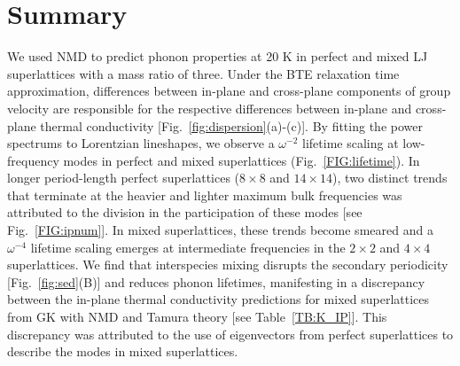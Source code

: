 \documentclass[aps,prb,preprint,preprintnumbers,amsmath,amssymb,floatfix,superscriptaddress]{revtex4}
\begin{document}


\section{Summary}

We used NMD to predict phonon properties at 20 K in perfect and mixed LJ superlattices with a mass ratio of three. Under the BTE relaxation time approximation, differences between in-plane and cross-plane components of group velocity are responsible for the respective differences between in-plane and cross-plane thermal conductivity [Fig.~\ref{fig:dispersion}(a)-(c)]. By fitting the power spectrums to Lorentzian lineshapes, we observe a $\omega^{-2}$ lifetime scaling at low-frequency modes in perfect and mixed superlattices (Fig.~\ref{FIG:lifetime}). In longer period-length perfect superlattices ($8 \times 8$ and $14 \times 14$), two distinct trends that terminate at the heavier and lighter maximum bulk frequencies was attributed to the division in the participation of these modes [see Fig.~\ref{FIG:ipnum}]. In mixed superlattices, these trends become smeared and a $\omega^{-4}$ lifetime scaling emerges at intermediate frequencies in the $2 \times 2$ and $4 \times 4$ superlattices. We find that interspecies mixing disrupts the secondary periodicity [Fig.~\ref{fig:sed}(B)] and reduces phonon lifetimes, manifesting in a discrepancy between the in-plane thermal conductivity predictions for mixed superlattices from GK with NMD and Tamura theory [see Table~\ref{TB:K_IP}]. This discrepancy was attributed to the use of eigenvectors from perfect superlattices to describe the modes in mixed superlattices.
\end{document}

